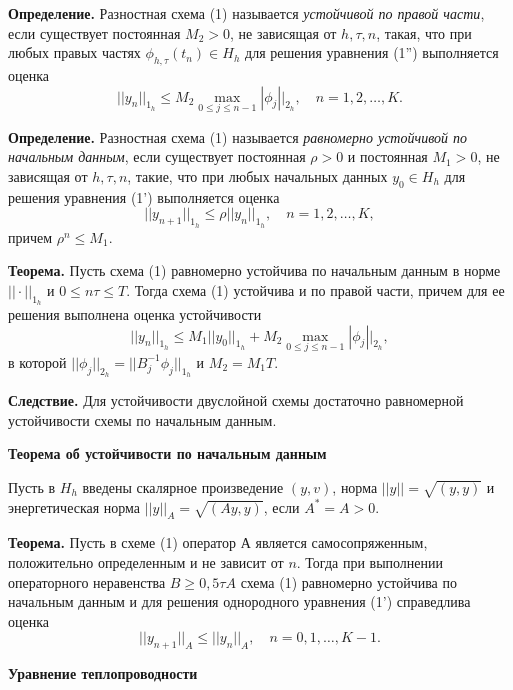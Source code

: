 \textbf{Определение.}
Разностная схема (1) называется \textit{устойчивой по правой части}, если существует постоянная $M_2>0$, не зависящая от  $h,\tau ,n$, такая, что при любых правых частях $\phi_{h,\tau}(t_n) \in H_h$ для решения уравнения (1'') выполняется оценка
\begin{equation*}
||y_n||_{1_h} \leq M_2  \max_{0 \leq j \leq n-1} |\phi_j||_{2_h}, \quad n=1,2,\dots ,K.
\end{equation*}

\textbf{Определение.}
Разностная схема (1) называется \textit{равномерно устойчивой по начальным данным}, если существует постоянная $\rho>0$ и постоянная $M_1>0$, не зависящая от  $h,\tau ,n$, такие, что при любых начальных данных $y_0 \in H_h$ для решения уравнения (1') выполняется оценка
\begin{equation*}
||y_{n+1}||_{1_h} \leq \rho ||y_n||_{1_h}, \quad n=1,2,\dots ,K,
\end{equation*}
причем $\rho^n \leq M_1.$

\textbf{Теорема.}
Пусть схема (1) равномерно устойчива по начальным данным в норме $||\cdot||_{1_h}$ и $0 \leq n\tau \leq T$. Тогда схема (1) устойчива и по правой части, причем для ее решения выполнена оценка устойчивости
\begin{equation*}
||y_n||_{1_h} \leq M_1 ||y_0||_{1_h} + M_2  \max_{0 \leq j \leq n-1} |\phi_j||_{2_h},
\end{equation*}
в которой $||\phi_j||_{2_h} = ||B_j^{-1} \phi_j||_{1_h}$ и $M_2=M_1 T$.

\textbf{Следствие.} Для устойчивости двуслойной схемы достаточно равномерной устойчивости схемы по начальным данным.

\par
\textbf{Теорема об устойчивости по начальным данным}

Пусть в $H_h$ введены скалярное произведение $(y,v)$, норма $||y||=\sqrt{(y,y)}$ и энергетическая норма $||y||_A=\sqrt{(Ay,y)}$, если $A^*=A>0$.

\textbf{Теорема.}
Пусть в схеме (1) оператор А является самосопряженным, положительно определенным и не зависит от $n$. Тогда при выполнении операторного неравенства $B \geq 0,5\tau A$ схема (1) равномерно устойчива по начальным данным и для решения однородного уравнения (1') справедлива оценка
\begin{equation*}
||y_{n+1}||_A \leq ||y_n||_A, \quad n=0,1,\dots , K-1.
\end{equation*}

\textbf{Уравнение теплопроводности}

